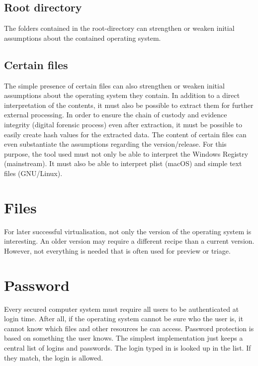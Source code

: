\subsection{Root directory}

The folders contained in the root-directory can strengthen or weaken initial assumptions about the contained operating system.

\subsection{Certain files}

The simple presence of certain files can also strengthen or weaken initial assumptions about the operating system they contain. In addition to a direct interpretation of the contents, it must also be possible to extract them for further external processing.
In order to ensure the chain of custody and evidence integrity (digital forensic process) even after extraction, it must be possible to easily create hash values for the extracted data.
The content of certain files can even substantiate the assumptions regarding the version/release.
For this purpose, the tool used must not only be able to interpret the Windows Registry (mainstream). It must also be able to interpret plist (macOS) and simple text files (GNU/Linux).

\section{Files}
\label{sec:files}

For later successful virtualisation, not only the version of the operating system is interesting. An older version may require a different recipe than a current version. 
However, not everything is needed that is often used for preview or triage. 

\section{Password}
\label{sec:password}

Every secured computer system must require all users to be authenticated at login time. After all, if the operating system cannot be sure who the user is, it cannot know which files and other resources he can access. Password protection is based on something the user knows. The simplest implementation just keeps a central list of logins and passwords. The login typed in is looked up in the list. If they match, the login is allowed. \cite{Tanenbaum2014:626}

